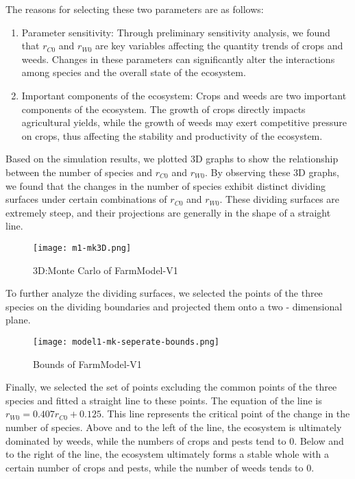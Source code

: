 \documentclass[12pt]{article}  %
\begin{document}
The reasons for selecting these two parameters are as follows:
\begin{enumerate}
    \item Parameter sensitivity: Through preliminary sensitivity analysis, we found that \(r_{C0}\) and \(r_{W0}\) are key variables affecting the quantity trends of crops and weeds. Changes in these parameters can significantly alter the interactions among species and the overall state of the ecosystem.
    
    \item  Important components of the ecosystem: Crops and weeds are two important components of the ecosystem. The growth of crops directly impacts agricultural yields, while the growth of weeds may exert competitive pressure on crops, thus affecting the stability and productivity of the ecosystem.
\end{enumerate}

Based on the simulation results, we plotted 3D graphs to show the relationship between the number of species and \(r_{C0}\) and \(r_{W0}\). By observing these 3D graphs, we found that the changes in the number of species exhibit distinct dividing surfaces under certain combinations of \(r_{C0}\) and \(r_{W0}\). These dividing surfaces are extremely steep, and their projections are generally in the shape of a straight line.

\begin{figure}[h]
    \centering
    \texttt{[image: m1-mk3D.png]}
    \caption{3D:Monte Carlo of FarmModel-V1}
\end{figure}

To further analyze the dividing surfaces, we selected the points of the three species on the dividing boundaries and projected them onto a two - dimensional plane.

\begin{figure}[h]
    \centering
    \texttt{[image: model1-mk-seperate-bounds.png]}
    \caption{Bounds of FarmModel-V1}
\end{figure}

Finally, we selected the set of points excluding the common points of the three species and fitted a straight line to these points. The equation of the line is \(r_{W0}=0.407r_{C0} + 0.125\). This line represents the critical point of the change in the number of species. Above and to the left of the line, the ecosystem is ultimately dominated by weeds, while the numbers of crops and pests tend to 0. Below and to the right of the line, the ecosystem ultimately forms a stable whole with a certain number of crops and pests, while the number of weeds tends to 0.
\end{document}
